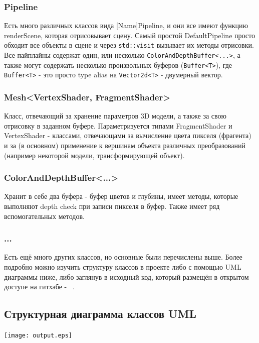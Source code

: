 \documentclass[14pt]{extarticle}
\begin{document}
\subsubsection{Pipeline}
Есть много различных классов вида [Name]Pipeline, и они все имеют функцию renderScene, которая отрисовывает сцену. Самый простой DefaultPipeline просто обходит все объекты в сцене и через \texttt{std::visit} вызывает их методы отрисовки. Все пайплайны содержат один, или несколько \texttt{ColorAndDepthBuffer<...>}, а также могут содержать несколько произвольных буферов (\texttt{Buffer<T>}), где \texttt{Buffer<T>} - это просто type alias на \texttt{Vector2d<T>} - двумерный вектор.

\subsubsection{Mesh<VertexShader, FragmentShader>}
Класс, отвечающий за хранение параметров 3D модели, а также за свою отрисовку в заданном буфере. Параметризуется типами FragmentShader и VertexShader - классами, отвечающами за вычисление цвета пикселя (фрагента) и за (в основном) применение к вершинам объекта различных преобразований (например некоторой модели, трансформирующей объект).

\subsubsection{ColorAndDepthBuffer<...>}
Хранит в себе два буфера - буфер цветов и глубины, имеет методы, которые выполняют depth check при записи пикселя в буфер. Также имеет ряд вспомогательных методов.

\subsubsection{...}
Есть ещё много других классов, но основные были перечислены выше. Более подробно можно изучить структуру классов в проекте либо с помощью UML диаграммы ниже, либо заглянув в исходный код, который размещён в открытом доступе на гитхабе - ~\cite{3dRenderer}.

\subsection{Структурная диаграмма классов UML}
\texttt{[image: output.eps]}
\end{document}
